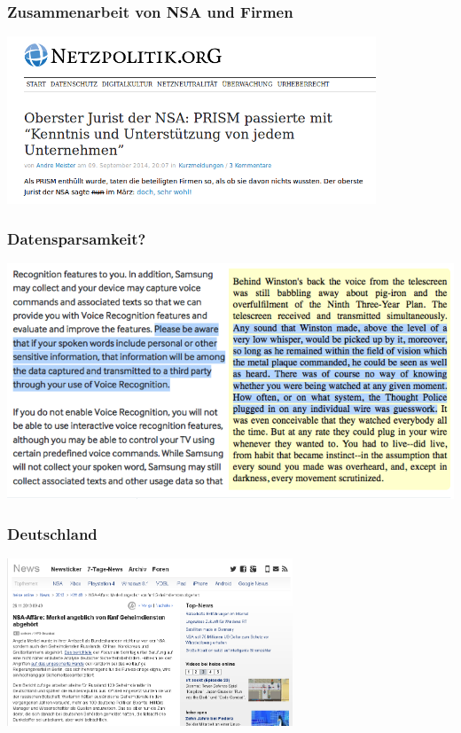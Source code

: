 \documentclass[12pt, xcolor={svgnames,table}]{beamer}
\begin{document}
\begin{frame}
  \frametitle{Zusammenarbeit von NSA und Firmen}
    \begin{center}
      \includegraphics[height=5cm]{img/prism_netzpolitik.png}
    \end{center}
\end{frame}

\begin{frame}
    \frametitle{Datensparsamkeit?}
    \begin{center}
      \includegraphics[height=0.7\textheight]{img/samsung-1984.png}
    \end{center}
\end{frame}

\begin{frame}
  \frametitle{Deutschland}
    \begin{center}
      \includegraphics[height=5cm]{img/heise-merkel.png}
    \end{center}
\end{frame}
\end{document}
